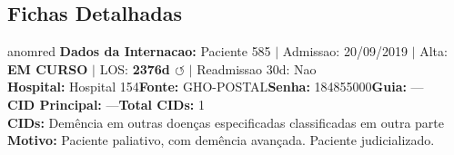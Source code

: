 \documentclass[a4paper,10pt]{article}
\begin{document}
\subsection{Fichas Detalhadas}
\begin{anomalycard}[Internacao 116 | GHO-POSTAL | CRITICO (z=5.11)]{anomred}
\textbf{Dados da Internacao:} Paciente 585 $\mid$ Admissao: 20/09/2019 $\mid$ Alta: \textcolor{anomorange}{\textbf{EM CURSO}} $\mid$ LOS: \textbf{2376d \textcolor{anomorange}{$\circlearrowleft$}} $\mid$ Readmissao 30d: Nao\\
\textbf{Hospital:} Hospital 154\quad\textbf{Fonte:} GHO-POSTAL\quad\textbf{Senha:} 184855000\quad\textbf{Guia:} ---\\
\textbf{CID Principal:} {\small ---}\quad\textbf{Total CIDs:} 1\\

\textbf{CIDs:} {\scriptsize Demência em outras doenças especificadas classificadas em outra parte}\\

\textbf{Motivo:} {\scriptsize Paciente paliativo, com demência avançada. Paciente judicializado.}\\


\end{anomalycard}
\end{document}
